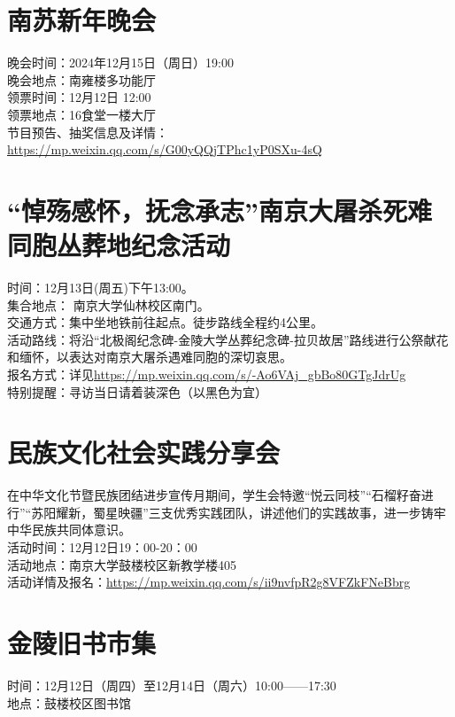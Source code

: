 \documentclass[letterpaper, 12pt]{article}
\begin{document}
\begin{multicols}{2}
\section{南苏新年晚会}
晚会时间：2024年12月15日（周日）19:00\\
晚会地点：南雍楼多功能厅\\
领票时间：12月12日 12:00\\
领票地点：16食堂一楼大厅\\
节目预告、抽奖信息及详情：\url{https://mp.weixin.qq.com/s/G00yQQjTPhc1yP0SXu-4sQ}\\

\section{“悼殇感怀，抚念承志”南京大屠杀死难同胞丛葬地纪念活动}
时间：12月13日(周五)下午13:00。\\
集合地点： 南京大学仙林校区南门。\\
交通方式：集中坐地铁前往起点。徒步路线全程约4公里。\\
活动路线：将沿“北极阁纪念碑-金陵大学丛葬纪念碑-拉贝故居”路线进行公祭献花和缅怀，以表达对南京大屠杀遇难同胞的深切哀思。\\
报名方式：详见\url{https://mp.weixin.qq.com/s/-Ao6VAj_gbBo80GTgJdrUg}\\
特别提醒：寻访当日请着装深色（以黑色为宜）\\

\section{民族文化社会实践分享会}
在中华文化节暨民族团结进步宣传月期间，学生会特邀“悦云同枝”“石榴籽奋进行”“苏阳耀新，蜀星映疆”三支优秀实践团队，讲述他们的实践故事，进一步铸牢中华民族共同体意识。\\
活动时间：12月12日19：00-20：00\\
活动地点：南京大学鼓楼校区新教学楼405\\
活动详情及报名：\url{https://mp.weixin.qq.com/s/ii9nvfpR2g8VFZkFNeBbrg}\\
\section{金陵旧书市集}
时间：12月12日（周四）至12月14日（周六）10:00——17:30\\
地点：鼓楼校区图书馆\\


\end{multicols}
\end{document}
